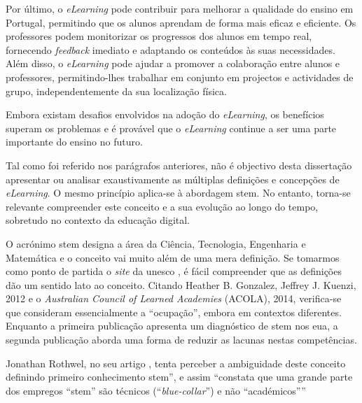 Por último, o \textit{eLearning} pode contribuir para melhorar a qualidade do ensino em Portugal, permitindo que os alunos aprendam de forma mais eficaz e eficiente. Os professores podem monitorizar os progressos dos alunos em tempo real, fornecendo \textit{feedback} imediato e adaptando os conteúdos às suas necessidades. Além disso, o \textit{eLearning} pode ajudar a promover a colaboração entre alunos e professores, permitindo-lhes trabalhar em conjunto em projectos e actividades de grupo, independentemente da sua localização física.

Embora existam desafios envolvidos na adoção do \textit{eLearning}, os benefícios superam os problemas e é provável que o \textit{eLearning} continue a ser uma parte importante do ensino no futuro.

Tal como foi referido nos parágrafos anteriores, não é objectivo desta dissertação apresentar ou analisar exaustivamente as múltiplas definições e concepções de \textit{eLearning}. O mesmo princípio aplica-se à abordagem \acrshort{stem}. No entanto, torna-se relevante compreender este conceito e a sua evolução ao longo do tempo, sobretudo no contexto da educação digital.

O acrónimo \acrshort{stem} designa a área da Ciência, Tecnologia, Engenharia e Matemática e o conceito vai muito além de uma mera definição. Se tomarmos como ponto de partida o \textit{site} da \acrshort{unesco} \cite{GlossaryUNESCO}, é fácil compreender que as definições dão um sentido lato ao conceito. Citando Heather B. Gonzalez, Jeffrey J. Kuenzi, 2012 e o \textit{Australian Council of Learned Academies} (ACOLA), 2014, verifica-se que consideram essencialmente a ``ocupação'', embora em contextos diferentes. Enquanto a primeira publicação apresenta um diagnóstico de \acrshort{stem} nos \acrfull{eua}, a segunda publicação aborda uma forma de reduzir as lacunas nestas competências.

Jonathan Rothwel, no seu artigo \cite{TheHidde2:online}, tenta perceber a ambiguidade deste conceito definindo primeiro conhecimento \acrshort{stem}'', e assim ``constata que uma grande parte dos empregos ``\acrshort{stem}'' são técnicos (``\textit{blue-collar}'') e não ``académicos''''

